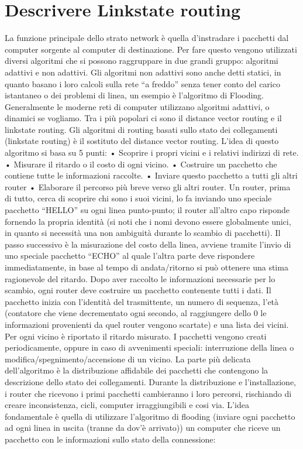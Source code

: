 \section{Descrivere Linkstate routing}

La funzione principale dello strato network è quella d’instradare i pacchetti dal computer sorgente al computer di destinazione. Per fare questo vengono utilizzati diversi algoritmi che si possono raggruppare in due grandi gruppo: algoritmi adattivi e non adattivi. Gli algoritmi non adattivi sono anche detti statici, in quanto basano i loro calcoli sulla rete “a freddo” senza tener conto del carico istantaneo o dei problemi di linea, un esempio è l’algoritmo di Flooding.
Generalmente le moderne reti di computer utilizzano algoritmi adattivi, o dinamici se vogliamo. Tra i più popolari ci sono il distance vector routing e il linkstate routing.
Gli algoritmi di routing basati sullo stato dei collegamenti (linkstate routing) è il sostituto del distance vector routing. L’idea di questo algoritmo si basa su 5 punti:
•	Scoprire i propri vicini e i relativi indirizzi di rete.
•	Misurare il ritardo o il costo di ogni vicino.
•	Costruire un pacchetto che contiene tutte le informazioni raccolte.
•	Inviare questo pacchetto a tutti gli altri router
•	Elaborare il percorso più breve verso gli altri router.
Un router, prima di tutto, cerca di scoprire chi sono i suoi vicini, lo fa inviando uno speciale pacchetto “HELLO” su ogni linea punto-punto; il router all’altro capo risponde fornendo la propria identità (si noti che i nomi devono essere globalmente unici, in quanto si necessità una non ambiguità durante lo scambio di pacchetti).
Il passo successivo è la misurazione del costo della linea, avviene tramite l’invio di uno speciale pacchetto “ECHO” al quale l’altra parte deve rispondere immediatamente, in base al tempo di andata/ritorno si può ottenere una stima ragionevole del ritardo.
Dopo aver raccolto le informazioni necessarie per lo scambio, ogni router deve costruire un pacchetto contenente tutti i dati. Il pacchetto inizia con l’identità del trasmittente, un numero di sequenza, l’età (contatore che viene decrementato ogni secondo, al raggiungere dello 0 le informazioni provenienti da quel router vengono scartate) e una lista dei vicini. Per ogni vicino è riportato il ritardo misurato. I pacchetti vengono creati periodicamente, oppure in caso di avvenimenti speciali: interruzione della linea o modifica/spegnimento/accensione di un vicino.
La parte più delicata dell’algoritmo è la distribuzione affidabile dei pacchetti che contengono la descrizione dello stato dei collegamenti. Durante la distribuzione e l’installazione, i router che ricevono i primi pacchetti cambieranno i loro percorsi, rischiando di creare inconsistenza, cicli, computer irraggiungibili e cosi via. L’idea fondamentale è quella di utilizzare l’algoritmo di flooding (inviare ogni pacchetto ad ogni linea in uscita (tranne da dov’è arrivato)) un computer che riceve un pacchetto con le informazioni sullo stato della connessione:
